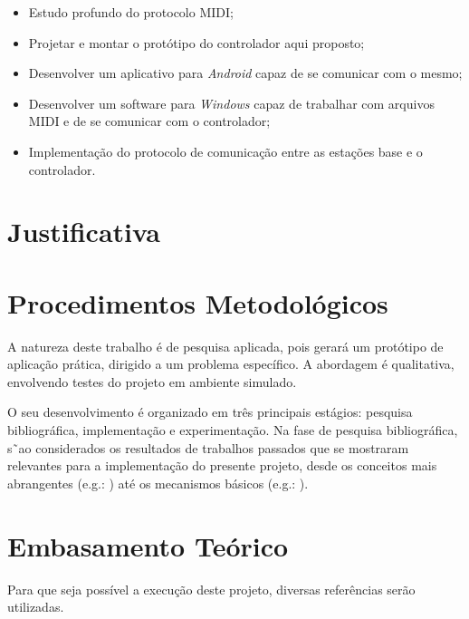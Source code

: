             \begin{itemize}
              \item Estudo profundo do protocolo MIDI;
              
              \item Projetar e montar o protótipo do controlador aqui proposto;
              
              \item Desenvolver um aplicativo para \textit{Android} capaz de se comunicar com o mesmo;
              
              \item Desenvolver um software para \textit{Windows} capaz de trabalhar com arquivos MIDI e de se comunicar com o controlador;
            
              \item Implementação do protocolo de comunicação entre as estações base e o controlador.
            \end{itemize}

    \section{Justificativa}



    \section{Procedimentos Metodológicos}

        A natureza deste trabalho é de pesquisa aplicada, pois gerará um protótipo de aplicação prática, dirigido a um problema específico. A abordagem é qualitativa, envolvendo testes do projeto em ambiente simulado.
        
        O seu desenvolvimento é organizado em três principais estágios: pesquisa bibliográfica, implementação e experimentação. Na fase de pesquisa bibliográfica, s˜ao considerados os resultados de trabalhos passados que se mostraram relevantes para a implementação do presente projeto, desde os conceitos mais abrangentes (e.g.: ) até os mecanismos básicos (e.g.: ).
        

    \section{Embasamento Teórico}

        Para que seja possível a execução deste projeto, diversas referências serão utilizadas.

